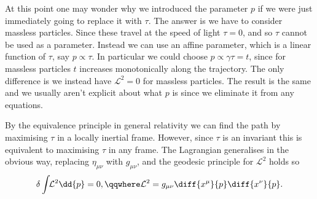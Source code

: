 \documentclass[fleqn]{NotesClass}
\newcommand*{\lagrangian}{\mathcal{L}}
\begin{document}
    At this point one may wonder why we introduced the parameter \(p\) if we were just immediately going to replace it with \(\tau\).
    The answer is we have to consider massless particles.
    Since these travel at the speed of light \(\tau = 0\), and so \(\tau\) cannot be used as a parameter.
    Instead we can use an affine parameter, which is a linear function of \(\tau\), say \(p \propto \tau\).
    In particular we could choose \(p \propto \gamma \tau = t\), since for massless particles \(t\) increases monotonically along the trajectory.
    The only difference is we instead have \(\lagrangian^2 = 0\) for massless particles.
    The result is the same and we usually aren't explicit about what \(p\) is since we eliminate it from any equations.
    
    By the equivalence principle in general relativity we can find the path by maximising \(\tau\) in a locally inertial frame.
    However, since \(\tau\) is an invariant this is equivalent to maximising \(\tau\) in any frame.
    The Lagrangian generalises in the obvious way, replacing \(\eta_{\mu\nu}\) with \(g_{\mu\nu}\), and the geodesic principle for \(\lagrangian^2\) holds so
    \begin{equation}
        \delta \int \!\! \lagrangian^2 \dd{p} = 0, \qqwhere \lagrangian^2 = g_{\mu\nu} \diff{x^\mu}{p} \diff{x^\nu}{p}.
    \end{equation}
    
\end{document}
